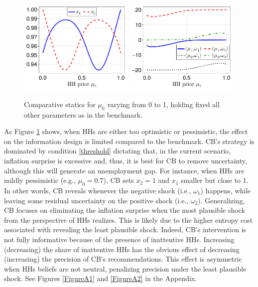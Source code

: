 \documentclass[12pt,a4paper]{article}
\begin{document}
\begin{figure}[H]
\centering
\includegraphics[width=0.49\textwidth]{figures/V11/γ=10.0-μ_0=0.5-α=1.0-θ=1.0-δ=0.5-ω_1=1.0-ω_2=-1.0/communication/fig_optimal_x_by_μ_0.pdf}
\includegraphics[width=0.49\textwidth]{figures/V11/γ=10.0-μ_0=0.5-α=1.0-θ=1.0-δ=0.5-ω_1=1.0-ω_2=-1.0/communication/fig_optimal_γ_by_μ_0.pdf}
\caption{Comparative statics for $\mu_0$ varying from 0 to 1, holding fixed all other parameters as in the benchmark.}
\label{Figure1}
\end{figure}

As Figure \ref{Figure1} shows, when HHs are either too optimistic or pessimistic, the effect on the information design is limited compared to the benchmark. CB's strategy is dominated by condition \eqref{threshold} dictating that, in the current scenario, inflation surprise is excessive and, thus, it is best for CB to remove uncertainty, although this will generate an unemployment gap. For instance, when HHs are mildly pessimistic (e.g., $\mu_0=0.7$), CB sets $x_2=1$ and $x_1$ smaller but close to 1. In other words, CB reveals whenever the negative shock (i.e., $\omega_1$) happens, while leaving some residual uncertainty on the positive shock (i.e., $\omega_2)$. Generalizing, CB focuses on eliminating the inflation surprise when the most plausible shock from the perspective of HHs realizes. This is likely due to the higher entropy cost associated with revealing the least plausible shock. Indeed, CB's intervention is not fully informative because of the presence of inattentive HHs. Increasing (decreasing) the share of inattentive HHs has the obvious effect of decreasing (increasing) the precision of CB's recommendations. This effect is asymmetric when HHs beliefs are not neutral, penalizing precision under the least plausible shock. See Figures \ref{FigureA1} and \ref{FigureA2} in the Appendix.
\end{document}
